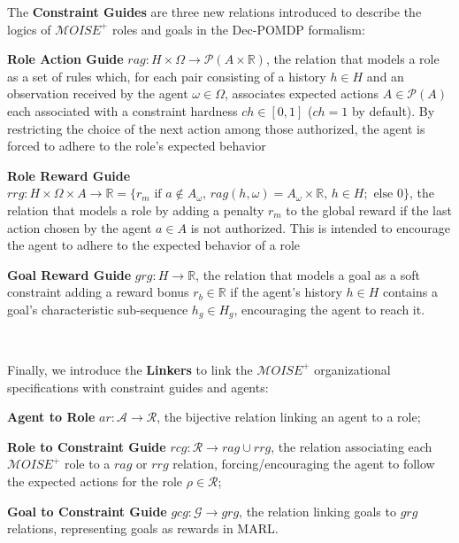 \documentclass[pdflatex,sn-mathphys-num]{sn-jnl}%
\theoremstyle{thmstyleone}%
\theoremstyle{thmstyletwo}%
\theoremstyle{thmstylethree}%
\begin{document}
\noindent The \textbf{Constraint Guides} are three new relations introduced to describe the logics of $\mathcal{M}OISE^+$ roles and goals in the Dec-POMDP formalism:
%
\begin{enumerate*}[label={\roman*) },itemjoin={; \quad}]
    
    \item \textbf{Role Action Guide} \quad $rag: H \times \Omega \rightarrow \mathcal{P}(A \times \mathbb{R})$, the relation that models a role as a set of rules which, for each pair consisting of a history $h \in H$ and an observation received by the agent $\omega \in \Omega$, associates expected actions $A \in \mathcal{P}(A)$ each associated with a constraint hardness $ch \in [0,1]$ ($ch = 1$ by default). By restricting the choice of the next action among those authorized, the agent is forced to adhere to the role's expected behavior
    \item \textbf{Role Reward Guide} \quad $rrg: H \times \Omega \times A \to \mathbb{R} = \{r_m \text{ if } a \notin A_\omega \text{, } rag(h, \omega) \allowbreak = \allowbreak A_\omega \times \mathbb{R} \text{, } h \in H; \text{ else } 0\}$, the relation that models a role by adding a penalty $r_m$ to the global reward if the last action chosen by the agent $a \in A$ is not authorized. This is intended to encourage the agent to adhere to the expected behavior of a role
    \item \textbf{Goal Reward Guide} \quad $grg: H \rightarrow \mathbb{R}$, the relation that models a goal as a soft constraint adding a reward bonus $r_b \in \mathbb{R}$ if the agent's history $h \in H$ contains a goal's characteristic sub-sequence $h_g \in H_g$, encouraging the agent to reach it.
\end{enumerate*}

\

\noindent Finally, we introduce the \textbf{Linkers} to link the $\mathcal{M}OISE^+$ organizational specifications with constraint guides and agents:
%
\begin{enumerate*}[label={\roman*) },itemjoin={; \quad}]
    
    \item \textbf{Agent to Role} \quad $ar: \mathcal{A} \to \mathcal{R}$, the bijective relation linking an agent to a role;
    \item \textbf{Role to Constraint Guide} \quad $rcg: \mathcal{R} \rightarrow rag \cup rrg$, the relation associating each $\mathcal{M}OISE^+$ role to a $rag$ or $rrg$ relation, forcing/encouraging the agent to follow the expected actions for the role $\rho \in \mathcal{R}$;
    \item \textbf{Goal to Constraint Guide} \quad $gcg: \mathcal{G} \rightarrow grg$, the relation linking goals to $grg$ relations, representing goals as rewards in MARL.
\end{enumerate*}
\end{document}
